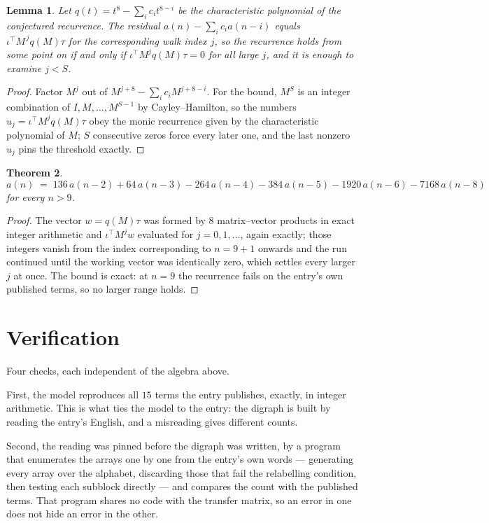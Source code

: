 \documentclass[11pt,a4paper]{article}
\theoremstyle{plain}
\newtheorem{theorem}{Theorem}
\newtheorem{lemma}[theorem]{Lemma}
\theoremstyle{definition}
\begin{document}
\begin{lemma}\label{lem:crit}
Let $q(t)=t^{8}-\sum_i c_it^{8-i}$ be the characteristic polynomial of the
conjectured recurrence. The residual $a(n)-\sum_ic_ia(n-i)$ equals
$\iota^{\!\top}M^{\,j}q(M)\tau$ for the corresponding walk index $j$, so the recurrence
holds from some point on if and only if $\iota^{\!\top}M^{j}q(M)\tau=0$ for all large $j$,
and it is enough to examine $j<S$.
\end{lemma}

\begin{proof}
Factor $M^{j}$ out of $M^{j+8}-\sum_ic_iM^{j+8-i}$. For the bound, $M^{S}$
is an integer combination of $I,M,\dots,M^{S-1}$ by Cayley--Hamilton, so the numbers
$u_j=\iota^{\!\top}M^{j}q(M)\tau$ obey the monic recurrence given by the characteristic
polynomial of $M$; $S$ consecutive zeros force every later one, and the last nonzero $u_j$
pins the threshold exactly.
\end{proof}

\begin{theorem}
\[
a(n)\;=\;136\,a(n-2) + 64\,a(n-3) - 264\,a(n-4) - 384\,a(n-5) - 1920\,a(n-6) - 7168\,a(n-8)
\]
for every $n>9$.
\end{theorem}

\begin{proof}
The vector $w=q(M)\tau$ was formed by $8$ matrix--vector products in exact integer
arithmetic and $\iota^{\!\top}M^{j}w$ evaluated for $j=0,1,\dots$, again exactly; those
integers vanish from the index corresponding to $n=9+1$ onwards and the run continued
until the working vector was identically zero, which settles every larger $j$ at once. The bound is exact: at $n=9$ the recurrence fails on the entry's own published terms, so no larger range holds.
\end{proof}

\section{Verification}

Four checks, each independent of the algebra above.

First, the model reproduces all $15$ terms the entry publishes, exactly, in integer
arithmetic. This is what ties the model to the entry: the digraph is built by reading the
entry's English, and a misreading gives different counts.

Second, the reading was pinned before the digraph was written, by a program that enumerates
the arrays one by one from the entry's own words --- generating every array over the
alphabet, discarding those that fail the relabelling condition, then testing each subblock
directly --- and compares the count with the published terms. That program shares no code
with the transfer matrix, so an error in one does not hide an error in the other.
\end{document}
